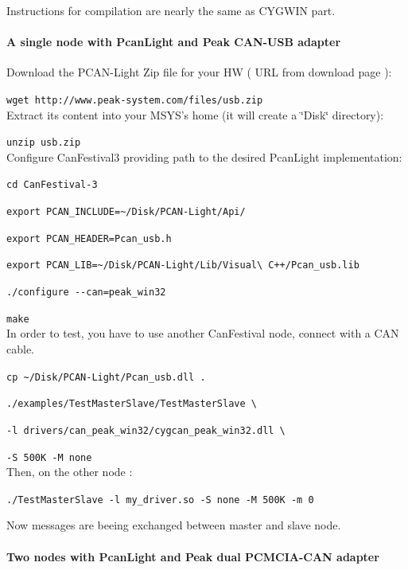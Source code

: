 \documentclass[a4paper,12pt]{book}
\begin{document}
Instructions for compilation are nearly the same as CYGWIN part. 


\paragraph{A single node with PcanLight and Peak CAN-USB adapter}

Download the PCAN-Light Zip file for your HW ( URL from download page
):

\texttt{wget http://www.peak-system.com/files/usb.zip}~\\


Extract its content into your MSYS's home (it will create a \char`\"{}Disk\char`\"{}
directory):

\texttt{unzip usb.zip}~\\


Configure CanFestival3 providing path to the desired PcanLight implementation:

\texttt{cd CanFestival-3}

\texttt{export PCAN\_INCLUDE=\~{ }/Disk/PCAN-Light/Api/}

\texttt{export PCAN\_HEADER=Pcan\_usb.h}

\texttt{export PCAN\_LIB=\~{ }/Disk/PCAN-Light/Lib/Visual\textbackslash{}
C++/Pcan\_usb.lib}

\texttt{./configure -{}-can=peak\_win32}

\texttt{make}~\\


In order to test, you have to use another CanFestival node, connect
with a CAN cable.

\texttt{cp \~{ }/Disk/PCAN-Light/Pcan\_usb.dll .}

\texttt{./examples/TestMasterSlave/TestMasterSlave \textbackslash{}}

\texttt{-l drivers/can\_peak\_win32/cygcan\_peak\_win32.dll \textbackslash{}}

\texttt{-S 500K -M none}~\\


Then, on the other node :

\texttt{./TestMasterSlave -l my\_driver.so -S none -M 500K -m 0}

Now messages are beeing exchanged between master and slave node.


\paragraph{Two nodes with PcanLight and Peak dual PCMCIA-CAN adapter}
\end{document}
